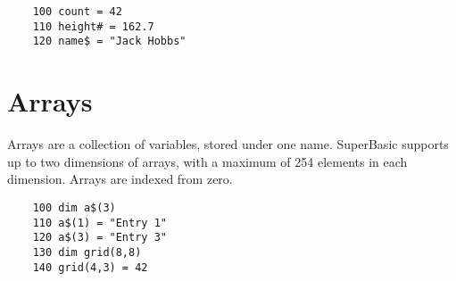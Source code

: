 \begin{verbatim}
	100 count = 42
	110 height# = 162.7
	120 name$ = "Jack Hobbs"
\end{verbatim}

\section{Arrays}

Arrays are a collection of variables, stored under one name. SuperBasic supports up to two dimensions of arrays, with a maximum of 254 elements in each dimension. Arrays are indexed from zero.

\begin{verbatim}
	100 dim a$(3)
	110 a$(1) = "Entry 1"
	120 a$(3) = "Entry 3"
	130 dim grid(8,8)
	140 grid(4,3) = 42
\end{verbatim}
